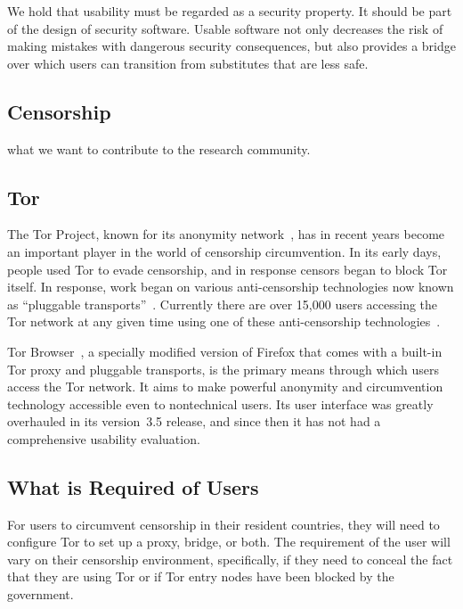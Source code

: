 \documentclass[letterpaper,twocolumn,11pt]{article}
\begin{document}
We hold that usability must be regarded as a security property.
It should be part of the design of security software.
Usable software not only decreases the risk of making mistakes
with dangerous security consequences,
but also provides a bridge over which users can
transition from substitutes that are less safe.


\subsection{Censorship} %

{\color {red} what we want to contribute to the research community.}

\subsection{Tor} 

The Tor Project, known for its anonymity network~\cite{tor-design},
has in recent years become an important player in the world of
censorship circumvention.
In its early days, people used Tor to evade censorship,
and in response censors began to block Tor itself.
In response, work began on various anti-censorship technologies
now known as ``pluggable transports''~\cite{pluggable-transports}.
Currently there are over 15,000 users accessing the Tor network
at any given time using one of these
anti-censorship technologies~\cite{userstats-bridge-country}.

Tor Browser~\cite{tor-browser},
a specially modified version of Firefox that comes
with a built-in Tor proxy and pluggable transports,
is the primary means through which users access the Tor network.
It aims to make powerful anonymity and circumvention technology
accessible even to nontechnical users.
Its user interface was greatly overhauled in its version~3.5 release,
and since then it has not had a comprehensive usability evaluation.

\subsection{What is Required of Users} %
\indent \indent For users to circumvent censorship in their resident countries, they will need to 
configure Tor to set up a proxy, bridge, or both. The requirement of the user will vary on their censorship
environment, specifically, if they need to conceal the fact that they are using Tor or if Tor entry nodes 
have been blocked by the government. 
\end{document}
